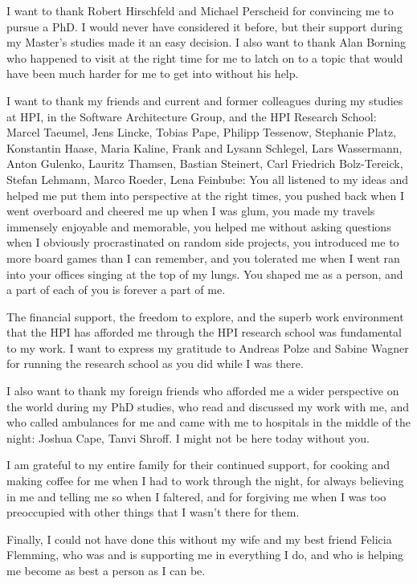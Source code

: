 I want to thank Robert Hirschfeld and Michael Perscheid for convincing me to
pursue a PhD. I would never have considered it before, but their support
during my Master's studies made it an easy decision. I also want to
thank Alan Borning who happened to visit at the right time for me to latch on
to a topic that would have been much harder for me to get into without his help.

I want to thank my friends and current and former colleagues during my studies
at HPI, in the Software Architecture Group, and the HPI Research School: Marcel
Taeumel, Jens Lincke, Tobias Pape, Philipp Tessenow, Stephanie Platz, Konstantin
Haase, Maria Kaline, Frank and Lysann Schlegel, Lars Wassermann, Anton Gulenko,
Lauritz Thamsen, Bastian Steinert, Carl Friedrich Bolz-Tereick, Stefan Lehmann,
Marco Roeder, Lena Feinbube: You all listened to my ideas and helped me put them
into perspective at the right times, you pushed back when I went overboard and
cheered me up when I was glum, you made my travels immensely enjoyable and
memorable, you helped me without asking questions when I obviously
procrastinated on random side projects, you introduced me to more board games
than I can remember, and you tolerated me when I went ran into your offices
singing at the top of my lungs. You shaped me as a person, and a part of each of
you is forever a part of me.

The financial support, the freedom to explore, and the superb work environment
that the HPI has afforded me through the HPI research school was fundamental to
my work. I want to express my gratitude to Andreas Polze and Sabine Wagner for
running the research school as you did while I was there.

I also want to thank my foreign friends who afforded me a wider perspective on
the world during my PhD studies, who read and discussed my work with me, and who
called ambulances for me and came with me to hospitals in the middle of the
night:
Joshua Cape, Tanvi Shroff. I might not be here today without you.

I am grateful to my entire family for their continued support, for cooking and
making coffee for me when I had to work through the night, for always believing
in me and telling me so when I faltered, and for forgiving me when I was too
preoccupied with other things that I wasn't there for them.

Finally, I could not have done this without my wife and my best friend Felicia
Flemming, who was and is supporting me in everything I do, and who is helping me
become as best a person as I can be.

